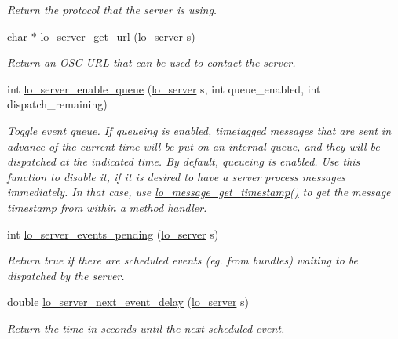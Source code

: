 \begin{DoxyCompactItemize}
\begin{DoxyCompactList}\small\item\em Return the protocol that the server is using. \end{DoxyCompactList}\item 
char $\ast$ \hyperlink{group__liblolowlevel_ga33df48c641833d330a8ba6704caf4977}{lo\+\_\+server\+\_\+get\+\_\+url} (\hyperlink{lo__types_8h_a59067bf50cf8abb4371da6f03c9036c9}{lo\+\_\+server} s)
\begin{DoxyCompactList}\small\item\em Return an O\+S\+C U\+R\+L that can be used to contact the server. \end{DoxyCompactList}\item 
int \hyperlink{group__liblolowlevel_ga3e23b9b6027042e136f344d001431ac6}{lo\+\_\+server\+\_\+enable\+\_\+queue} (\hyperlink{lo__types_8h_a59067bf50cf8abb4371da6f03c9036c9}{lo\+\_\+server} s, int queue\+\_\+enabled, int dispatch\+\_\+remaining)
\begin{DoxyCompactList}\small\item\em Toggle event queue. If queueing is enabled, timetagged messages that are sent in advance of the current time will be put on an internal queue, and they will be dispatched at the indicated time. By default, queueing is enabled. Use this function to disable it, if it is desired to have a server process messages immediately. In that case, use \hyperlink{group__liblolowlevel_ga164e068064afa94454eb6515b9b1748d}{lo\+\_\+message\+\_\+get\+\_\+timestamp()} to get the message timestamp from within a method handler. \end{DoxyCompactList}\item 
int \hyperlink{group__liblolowlevel_ga04feb1063c3f4df6fec41405b28dd99a}{lo\+\_\+server\+\_\+events\+\_\+pending} (\hyperlink{lo__types_8h_a59067bf50cf8abb4371da6f03c9036c9}{lo\+\_\+server} s)
\begin{DoxyCompactList}\small\item\em Return true if there are scheduled events (eg. from bundles) waiting to be dispatched by the server. \end{DoxyCompactList}\item 
double \hyperlink{group__liblolowlevel_ga750076fdd75e2a7d3e442f6bd5968fb9}{lo\+\_\+server\+\_\+next\+\_\+event\+\_\+delay} (\hyperlink{lo__types_8h_a59067bf50cf8abb4371da6f03c9036c9}{lo\+\_\+server} s)
\begin{DoxyCompactList}\small\item\em Return the time in seconds until the next scheduled event. \end{DoxyCompactList}\item 

\end{DoxyCompactItemize}
